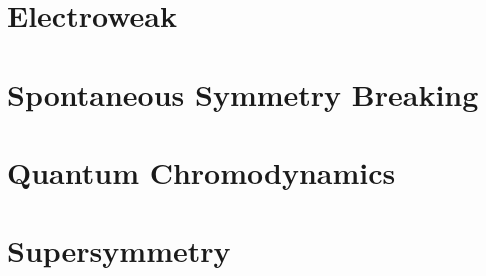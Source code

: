\section{Electroweak}
\section{Spontaneous Symmetry Breaking}
\section{Quantum Chromodynamics}
\section{Supersymmetry}
